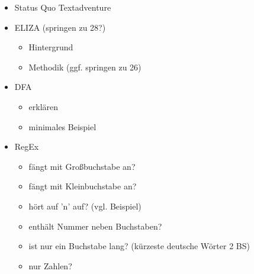 \documentclass[15pt,a4]{article}
\begin{document}
\begin{LARGE}
\begin{itemize}
\begin{itemize}
\begin{itemize}
					\end{itemize}
			\end{itemize}
		\item Status Quo Textadventure
		\item ELIZA (springen zu 28?)
			\begin{itemize}
				\item Hintergrund
				\item Methodik (ggf. springen zu 26)
			\end{itemize}
		\item DFA
			\begin{itemize}
				\item erklären
				\item minimales Beispiel
			\end{itemize}
		\item RegEx
			\begin{itemize}
				\item fängt mit Großbuchstabe an?
				\item fängt mit Kleinbuchstabe an?
				\item hört auf 'n' auf? (vgl. Beispiel)
				\item enthält Nummer neben Buchstaben?
				\item ist nur ein Buchstabe lang? (kürzeste deutsche Wörter 2 BS)
				\item nur Zahlen?
			\end{itemize}
	\end{itemize}
	\end{LARGE}
\end{document}
